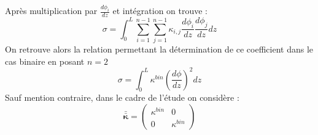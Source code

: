 Après multiplication par $\displaystyle \frac{d\phi_i}{dz}$ et intégration on trouve :
\begin{equation}
\sigma = \int_0^L \sum_{i=1}^{n-1}\sum_{j=1}^{n-1} \kappa_{i,j}\frac{d\phi_i}{dz}\frac{d\phi_j}{dz}dz
\end{equation}
On retrouve alors la relation permettant la détermination de ce coefficient dans le cas binaire en posant $n=2$
\begin{equation}
\sigma = \int_0^L\kappa^{bin}\left(\frac{d\phi}{dz}\right)^2dz
\end{equation}
Sauf mention contraire, dans le cadre de l'étude on considère :
\begin{equation}
\bm{\bar{\bar{\kappa}}} =    \begin{pmatrix} 
\kappa^{bin}& 0 \\ 
0				& \kappa^{bin} 
\end{pmatrix} 
\end{equation}
